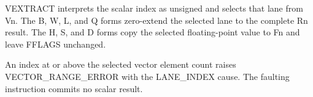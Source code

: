 VEXTRACT interprets the scalar index as unsigned and selects that lane from
Vn. The B, W, L, and Q forms zero-extend the selected lane to the complete Rn
result. The H, S, and D forms copy the selected floating-point value to Fn and
leave FFLAGS unchanged.

An index at or above the selected vector element count raises
VECTOR\_RANGE\_ERROR with the LANE\_INDEX cause. The faulting instruction
commits no scalar result.
